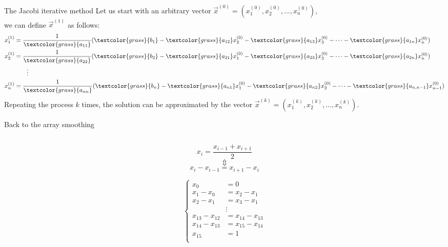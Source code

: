 \documentclass[UKenglish,aspectratio=169]{beamer}
\newcommand\known[1]{\textcolor{grass}{#1}}
\begin{document}
\begin{frame}{The Jacobi iterative method}
Let us start with an arbitrary vector $\vec{x}^{(0)}=\left(x_1^{(0)}, x_2^{(0)}, \dots, x_n^{(0)}\right)$,\\
\pause
we can define $\vec{x}^{(1)}$ as follows:
\begin{align*}
x_1^{(1)} &= \frac{1}{\known{a_{11}}}(\known{b_1} - \known{a_{12}}x_2^{(0)} - \known{a_{13}}x_3^{(0)} - \cdots - \known{a_{1n}}x_n^{(0)})\\
x_2^{(1)} &= \frac{1}{\known{a_{22}}}(\known{b_2} - \known{a_{21}}x_1^{(0)} - \known{a_{23}}x_3^{(0)} - \cdots - \known{a_{2n}}x_n^{(0)})\\
    & \qquad \vdots \\
x_n^{(1)} &= \frac{1}{\known{a_{nn}}}(\known{b_n} - \known{a_{n1}}x_1^{(0)} - \known{a_{n2}}x_2^{(0)} - \cdots - \known{a_{n,n-1}}x_{n-1}^{(0)})
\end{align*}
\pause
Repeating the process $k$ times, the solution can be approximated by the vector $\vec{x}^{(k)}=\left(x_1^{(k)}, x_2^{(k)}, \dots, x_n^{(k)}\right)$.
\end{frame}

\begin{frame}{Back to the array smoothing}
\inputminted[frame=single]{python}{listings/example_3.1.py}
\pause
\begin{minipage}{.45\linewidth}
$$x_i = \frac{x_{i-1}+x_{i+1}}{2}$$
\pause 
$$\Updownarrow$$ $$ x_i-x_{i-1} = x_{i+1} - x_i$$
\end{minipage}
\pause
\begin{minipage}{.45\linewidth}
$$
\left\{
\begin{array}{rl}
 x_0 &= 0 \\
x_1-x_0 &= x_2-x_1 \\
x_2-x_1 &= x_3-x_1 \\
     &  \vdots \\
x_{13}-x_{12}     &= x_{14}-x_{13} \\
x_{14}-x_{13}     &= x_{15}-x_{14} \\
x_{15} &= 1 \\
\end{array}
\right.
$$
\end{minipage}
\end{frame}
\end{document}
